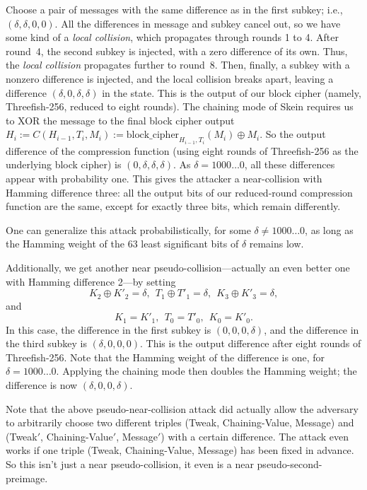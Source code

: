 \documentclass[11pt,twoside]{article}
\begin{document}
Choose a pair of messages with the same difference as in the first subkey; i.e., $(\delta, \delta, 0, 0)$. All the differences in message and subkey cancel out, so we have some kind of a \emph{local collision}, which propagates through rounds 1 to 4. After round~4, the second subkey is injected, with a zero difference of its own. Thus, the \emph{local collision} propagates further to round~8. Then, finally, a subkey with a nonzero difference is injected, and the local collision breaks apart, leaving a difference $(\delta, 0, \delta, \delta)$ in the state. This is the output of our block cipher (namely, Threefish-256, reduced to eight rounds). The chaining mode of Skein requires us to XOR the message to the final block cipher output
  \( H_i := C(H_{i-1},T_i, M_i)
          :=\mbox{block\_cipher}_{H_{i-1}, T_i}(M_i) \oplus M_i
  \). 
So the output difference of the compression function (using eight rounds of Threefish-256 as the underlying block cipher) is $(0, \delta, \delta, \delta)$. As $\delta=1000\ldots0$, all these differences appear with probability one. This gives the attacker a near-collision with Hamming difference three: all the output bits of our reduced-round compression function are the same, except for exactly three bits, which remain differently.

One can generalize this attack probabilistically, for some $\delta \neq 1000\ldots0$, as long as the Hamming weight of the 63 least significant bits of $\delta$ remains low.

Additionally, we get another near pseudo-collision---actually an even  better one with Hamming difference 2---by setting
  \[ K_2 \oplus K'_2 = \delta, \ \ T_1 \oplus T'_1 = \delta, \ \
     K_3 \oplus K'_3 = \delta,
  \]
and
  \[ K_1 = K'_1, \ \ T_0 = T'_0, \ \ K_0 = K'_0. \]
In this case, the difference in the first subkey is
  $(0, 0, 0, \delta)$,
and the difference in the third subkey is
  $(\delta, 0, 0, 0)$.
This is the output difference after eight rounds of Threefish-256. Note that the Hamming weight of the difference is one, for $\delta=1000\ldots0$. Applying the chaining mode then doubles the Hamming weight; the difference is now 
  $(\delta, 0, 0, \delta)$.

Note that the above pseudo-near-collision attack did actually allow the adversary to arbitrarily choose two different triples  (Tweak, Chaining-Value, Message) and (Tweak$'$, Chaining-Value$'$, Message$'$) with a certain difference. The attack even works if one triple (Tweak, Chaining-Value, Message) has been fixed in advance. So this isn't just a near pseudo-collision, it even is a near pseudo-second-preimage.
\end{document}
